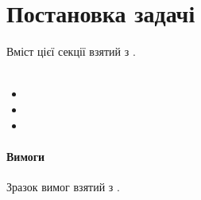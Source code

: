 \sffamily

\section{Постановка задачі}
Вміст цієї секції взятий з \cite{CSHPiskunov}.\\
 \\
\begin{itemize}
	\item
	\item
	\item
\end{itemize}

\paragraph{Вимоги}
Зразок вимог взятий з \cite{kulikov}. 
